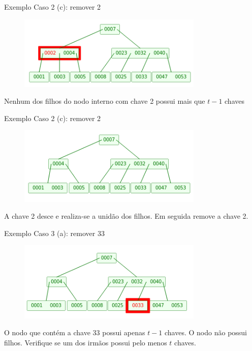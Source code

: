 \documentclass[aspectratio=169]{beamer}
\begin{document}
{\begin{frame}{Exemplo}
Caso 2 (c): remover 2
\begin{figure}[!h]
\centering
   \includegraphics[width=250pt]{imagens/remocao9.png}
  \label{fig_remocao9}
\end{figure} 
Nenhum dos filhos do nodo interno com chave 2 possui mais que $t-1$ chaves
\end{frame}


\begin{frame}{Exemplo}
Caso 2 (c): remover 2
\begin{figure}[!h]
\centering
   \includegraphics[width=250pt]{imagens/remocao10.png}
  \label{fig_remocao10}
\end{figure} 
A chave 2 desce e realiza-se a unidão dos filhos. Em seguida remove a chave 2.
\end{frame}


\begin{frame}{Exemplo}
Caso 3 (a): remover 33
\begin{figure}[!h]
\centering
   \includegraphics[width=250pt]{imagens/remocao11.png}
  \label{fig_remocao11}
\end{figure} 
O nodo que contém a chave 33 possui apenas $t-1$ chaves. O nodo não possui filhos. Verifique se um dos irmãos possui pelo menos $t$ chaves.
\end{frame}

}
\end{document}
